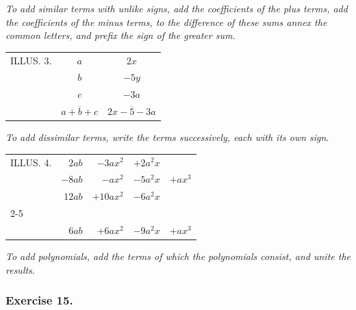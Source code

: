 \documentclass{book}
\begin{document}
\textit{ To add similar terms with unlike signs, add the
coefficients of the plus terms, add the coefficients of the minus
terms, to the difference of these sums annex the common letters,
and prefix the sign of the greater sum.}

\begin{tabular}{l c c}
ILLUS. 3.&$a$&$2x$\\
&$b$&$-5y$\\
&$c$&$-3a$\\
&$\overline{a + b + c}$&$\overline{2x - 5 - 3a}$\\
\end{tabular}

\textit{ To add dissimilar terms, write the terms successively,
each with its own sign}.

\begin{tabular}{lrrrr}
ILLUS. 4. &$2ab$ & $-3ax^2 $ & $+ 2a^2x$\\
&$-8ab $ & $-ax^2 $ & $- 5a^2x $&$+ ax^3$\\
&$12ab $&$+10ax^2 $ & $- 6a^2x$\\
\cline{2-5}\\
&$6ab $&$+6ax^2$ & $ - 9a^2x$ & $ + ax^3$\\
\end{tabular}

\textit{ To add polynomials, add the terms of which the
polynomials consist, and unite the results}.

\subsubsection*{Exercise 15.}
\end{document}
